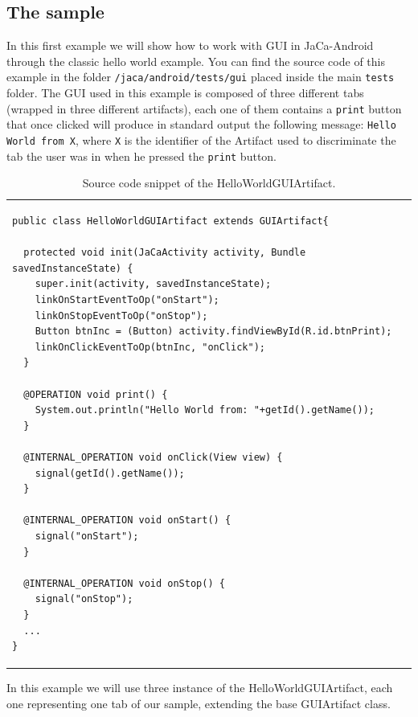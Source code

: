 \documentclass[11pt]{report}
\newcommand\labeltab[1]{\label{tb:#1}}
\newcommand\code[1]{{\mbox{\texttt{{#1}}}}}
\newcommand{\jacandroid}{\textsf{JaCa-Android}}
\begin{document}
\subsection{The sample}
In this first example we will show how to work with GUI in \jacandroid{} through the classic hello world example. You can find the source code of this example in the folder \code{/jaca/android/tests/gui} placed inside the main \code{tests} folder. The GUI used in this example is composed of three different tabs (wrapped in three different artifacts), each one of them contains a \code{print} button that once clicked will produce in standard output the following message: \code{Hello World from X}, where \code{X} is the identifier of the Artifact used to discriminate the tab the user was in when he pressed the \code{print} button.


\begin{table}[!h]
\begin{tabular} {p{10cm}}
\begin{minipage}{10cm}

{\scriptsize \begin{verbatim}
public class HelloWorldGUIArtifact extends GUIArtifact{

  protected void init(JaCaActivity activity, Bundle savedInstanceState) {
    super.init(activity, savedInstanceState);
    linkOnStartEventToOp("onStart");
    linkOnStopEventToOp("onStop");
    Button btnInc = (Button) activity.findViewById(R.id.btnPrint);
    linkOnClickEventToOp(btnInc, "onClick");
  }
	
  @OPERATION void print() {
    System.out.println("Hello World from: "+getId().getName());
  }
	
  @INTERNAL_OPERATION void onClick(View view) {
    signal(getId().getName());
  }
	
  @INTERNAL_OPERATION void onStart() {
    signal("onStart");
  }
    
  @INTERNAL_OPERATION void onStop() {
    signal("onStop");
  }
  ...
}
\end{verbatim}}
\end{minipage}
\end{tabular}
\caption{Source code snippet of the \textsf{HelloWorldGUIArtifact}.}
    \labeltab{HelloWorldGUIArtifact}
\end{table}

In this example we will use three instance of the \textsf{HelloWorldGUIArtifact}, each one representing one tab of our sample, extending the base \textsf{GUIArtifact} class. 
\end{document}
